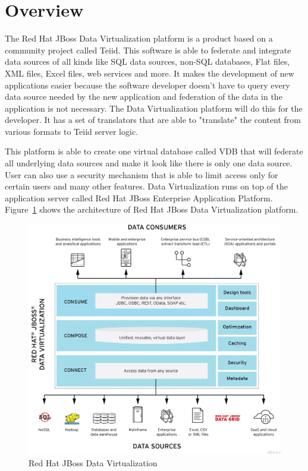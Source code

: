 \documentclass[12pt,oneside]{fithesis2}
\begin{document}
\section{Overview}
\par The Red Hat JBoss Data Virtualization platform is a product based on a community project called Teiid.  This software is able to federate and integrate data sources of all kinds like SQL data sources, non-SQL databases, Flat files, XML files, Excel files, web services and more. It makes the development of new applications easier because the software developer doesn't have to query every data source needed by the new application and federation of the data in the application is not necessary. The Data Virtualization platform will do this for the developer. It has a set of translators that are able to "translate" the content from various formats to Teiid server logic.
\par This platform is able to create one virtual database called VDB that will federate all underlying data sources and make it look like there is only one data source. User can also use a security mechanism that is able to limit  access only for certain users and many other features. Data Virtualization runs on top of the application server called Red Hat JBoss Enterprise Application Platform. Figure~\ref{fig:dv} shows the architecture of Red Hat JBoss Data Virtualization platform.
\begin{figure}[H]
\caption{Red Hat JBoss Data Virtualization\cite{dvimage}}
\label{fig:dv}
\centering
\vspace{5mm}
\includegraphics[scale=0.65]{dv} 
\end{figure}
\end{document}
